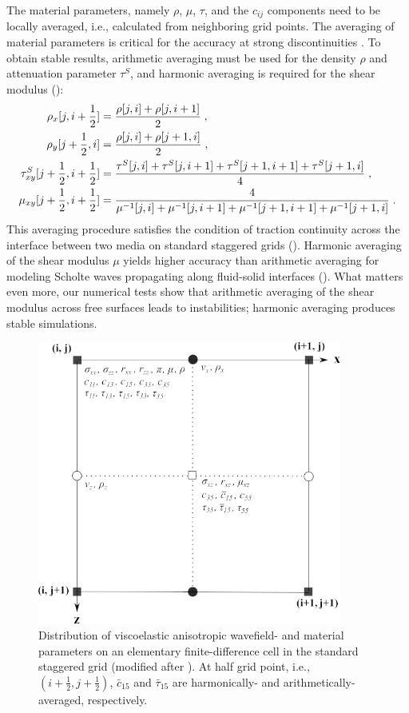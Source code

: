 The material parameters, namely $\rho$, $\mu$, $\tau$, and the $c_{ij}$ components need to be locally averaged, i.e., calculated from neighboring grid points. The averaging of material parameters is critical for the accuracy at strong discontinuities \citep{zahradnik:93,falk:98,moczo:02}. To obtain stable results, arithmetic averaging  must be used for the density $\rho$ and attenuation parameter $\tau^S$, and harmonic averaging is required for the shear modulus (\cite{fellinger:95,graves:96,falk:98,vossen:02,moczo:02}):
\begin{subequations}
\allowdisplaybreaks
    \begin{align}
        \rho_x[j,i+\frac{1}{2}] &= \frac{\rho[j,i]+\rho[j,i+1]}{2}\;,\\
        \rho_y[j+\frac{1}{2},i] &= \frac{\rho[j,i]+\rho[j+1,i]}{2}\;,\\
        \tau^S_{xy}[j+\frac{1}{2},i+\frac{1}{2}] &= \frac{\tau^S[j,i]+\tau^S[j,i+1]+\tau^S[j+1,i+1]+\tau^S[j+1,i]}{4}\;,\\
        \mu_{xy}[j+\frac{1}{2},i+\frac{1}{2}] &= \frac{4}{\mu^{-1}[j,i]+\mu^{-1}[j,i+1]+\mu^{-1}[j+1,i+1]+\mu^{-1}[j+1,i]}\;.
        \label{eq:stress_vti2}
    \end{align}
\end{subequations}
This averaging procedure satisfies the condition of traction continuity across the interface between two media on standard staggered grids (\cite{moczo:02}). Harmonic averaging of the shear modulus $\mu$ yields higher accuracy than arithmetic averaging for modeling Scholte waves propagating along fluid-solid interfaces (\cite{falk:98}). What matters even more, our numerical tests show that arithmetic averaging of the shear modulus across free surfaces leads to instabilities; harmonic averaging produces stable simulations. 
\begin{figure}[ht!]
    \centering
    \includegraphics[width=10cm]{figures/ssg_final.png}
    \caption{Distribution of viscoelastic anisotropic wavefield- and material parameters on an elementary finite-difference cell in the standard staggered grid (modified after \cite{virieux:86}).
    At half grid point, i.e., $(i+\frac{1}{2},j+\frac{1}{2})$, $\bar{c}_{15}$ and $\bar{\tau}_{15}$ are harmonically- and arithmetically-averaged, respectively.}
    \label{fig:ssg}
\end{figure}

